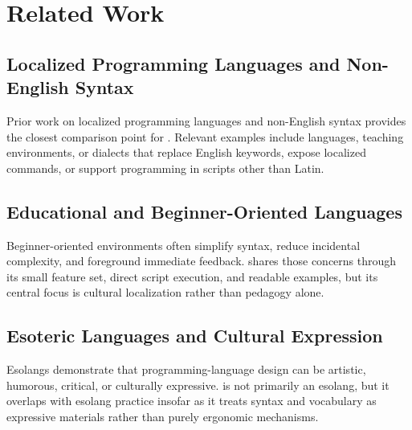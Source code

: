 \section{Related Work}

\subsection{Localized Programming Languages and Non-English Syntax}

Prior work on localized programming languages and non-English syntax provides
the closest comparison point for \plat. Relevant examples include languages,
teaching environments, or dialects that replace English keywords, expose
localized commands, or support programming in scripts other than Latin.

\citep{todo-localized-programming-languages}

\subsection{Educational and Beginner-Oriented Languages}

Beginner-oriented environments often simplify syntax, reduce incidental
complexity, and foreground immediate feedback. \plat{} shares those concerns
through its small feature set, direct script execution, and readable examples,
but its central focus is cultural localization rather than pedagogy alone.

\citep{todo-educational-languages}

\subsection{Esoteric Languages and Cultural Expression}

Esolangs demonstrate that programming-language design can be artistic,
humorous, critical, or culturally expressive. \plat{} is not primarily an
esolang, but it overlaps with esolang practice insofar as it treats syntax and
vocabulary as expressive materials rather than purely ergonomic mechanisms.

\citep{todo-esolangs-cultural-expression}

